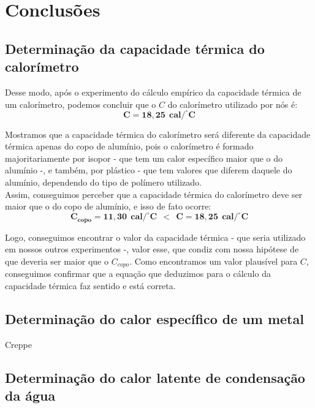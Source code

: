 \newpage
\section{Conclusões}


\subsection{Determinação da capacidade térmica do calorímetro}

Desse modo, após o experimento do cálculo empírico da capacidade térmica de um calorímetro, podemos concluir que o $C$ do calorímetro utilizado por nós é:
\[ \mathbf{C = 18,25 \ \  cal/^\circ C}\]

Mostramos que a capacidade térmica do calorímetro será diferente da capacidade térmica apenas do copo de alumínio, pois o calorímetro é formado majoritariamente por isopor - que tem um calor específico maior que o do alumínio -, e também, por plástico - que tem valores que diferem daquele do alumínio, dependendo do tipo de polímero utilizado.\\

Assim, conseguimos perceber que a capacidade térmica do calorímetro deve ser maior que o do copo de alumínio, e isso de fato ocorre:
\[\mathbf{ C_{copo} = 11,30 \ \ cal/^\circ C \ \ < \ \ C = 18,25 \ \ cal/^\circ C}\]

Logo, conseguimos encontrar o valor da capacidade térmica - que seria utilizado em nossos outros experimentos -, valor esse, que condiz com nossa hipótese de que deveria ser maior que o $C_{copo}$. Como encontramos um valor plausível para $C$, conseguimos confirmar que a equação que deduzimos para o cálculo da capacidade térmica faz sentido e está correta.


\subsection{Determinação do calor específico de um metal}

Creppe


\subsection{Determinação do calor latente de condensação da água}

